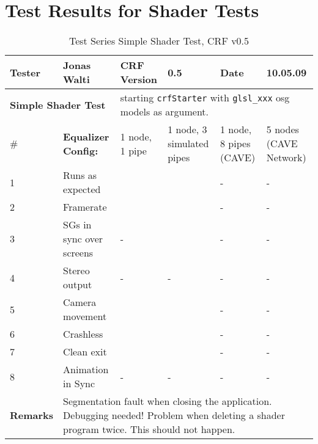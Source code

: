 \section{Test Results for Shader Tests}
\begin{table}[H]
	\centering
	\begin{tabular}{|b{}|b{}|m{}|m{}|m{}|m{}|}
		\hline
		\bfseries Tester & Jonas Walti & \bfseries CRF Version & 0.5 & \bfseries Date & 10.05.09 \\
		\hline
		\hline
		\multicolumn{2}{|l|}{\large{\bfseries Simple Shader Test}} & \multicolumn{4}{p{0.6\textwidth}|}{starting \texttt{crfStarter} with \texttt{glsl\_xxx} osg models as argument.} \\
		\hline
		\hline
		\# & \bfseries Equalizer Config: & 1 node, 1 pipe & 1 node, 3 simulated pipes &  1 node, 8 pipes (CAVE) &  5 nodes (CAVE Network) \\
		\hline 1 & Runs as expected & \tick & \tick & \quad\quad- & \quad\quad- \\
		\hline 2 & Framerate & \quad\quad 60 & \quad\quad 20 & \quad\quad- & \quad\quad- \\
		\hline 3 & SGs in sync over screens & \quad\quad- & \tick & \quad\quad- & \quad\quad- \\
		\hline 4 & Stereo output & \quad\quad- & \quad\quad- & \quad\quad- & \quad\quad- \\
		\hline 5 & Camera movement & \tick & \tick & \quad\quad- & \quad\quad-\\
		\hline 6 & Crashless & \tick & \tick & \quad\quad- & \quad\quad-\\
		\hline 7 & Clean exit & \cross & \cross & \quad\quad- & \quad\quad- \\
		\hline 8 & Animation in Sync & \quad\quad- & \quad\quad- & \quad\quad- & \quad\quad- \\
		\hline
		\hline \bfseries Remarks & \multicolumn{5}{p{0.85\textwidth}|}{Segmentation fault when closing the application. Debugging needed! Problem when deleting a shader program twice. This should not happen.}\\
		\hline
	\end{tabular}
	\caption{Test Series Simple Shader Test, CRF v0.5}
	\label{table:test3}
\end{table}

